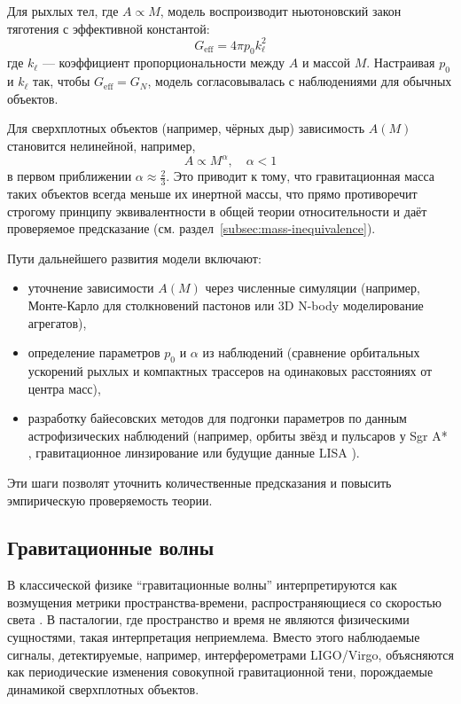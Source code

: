 \documentclass[pdflatex,sn-mathphys-num]{sn-jnl}
\begin{document}
Для рыхлых тел, где \( A \propto M \), модель воспроизводит ньютоновский закон тяготения \cite{newton1687-principia, halliday2013-fundamentals} с эффективной константой:
\[
G_{\text{eff}} = 4\pi p_0 k_\ell^2
\]
где \( k_\ell \) --- коэффициент пропорциональности между \( A \) и массой \( M \). Настраивая \( p_0 \) и \( k_\ell \) так, чтобы \( G_{\text{eff}} = G_N \), модель согласовывалась с наблюдениями для обычных объектов.

Для сверхплотных объектов (например, чёрных дыр) зависимость \( A(M) \) становится нелинейной, например,
\[
A \propto M^\alpha, \quad \alpha < 1
\]
в первом приближении \( \alpha \approx \frac{2}{3} \). Это приводит к тому, что гравитационная масса таких объектов всегда меньше их инертной массы, что прямо противоречит строгому принципу эквивалентности в общей теории относительности и даёт проверяемое предсказание (см. раздел~\ref{subsec:mass-inequivalence}).

Пути дальнейшего развития модели включают:
\begin{itemize}
    \item уточнение зависимости \( A(M) \) через численные симуляции \cite{newman2013-computational} (например, Монте-Карло для столкновений пастонов или 3D N-body моделирование агрегатов),
    \item определение параметров \( p_0 \) и \( \alpha \) из наблюдений (сравнение орбитальных ускорений рыхлых и компактных трассеров на одинаковых расстояниях от центра масс),
    \item разработку байесовских методов для подгонки параметров по данным астрофизических наблюдений (например, орбиты звёзд и пульсаров у Sgr A* \cite{ghez2008-sgrA}, гравитационное линзирование \cite{schneider2006-lensing} или будущие данные LISA \cite{lisa-consortium2017}).
\end{itemize}
Эти шаги позволят уточнить количественные предсказания и повысить эмпирическую проверяемость теории.

\subsection{Гравитационные волны}\label{subsec:gravitational-waves}

В классической физике ``гравитационные волны'' интерпретируются как возмущения метрики пространства-времени, распространяющиеся со скоростью света \cite{ligo2016-detection}. В пасталогии, где пространство и время не являются физическими сущностями, такая интерпретация неприемлема. Вместо этого наблюдаемые сигналы, детектируемые, например, интерферометрами LIGO/Virgo, объясняются как периодические изменения совокупной гравитационной тени, порождаемые динамикой сверхплотных объектов.
\end{document}

